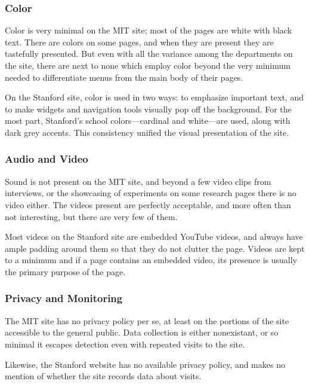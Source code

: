 \begin{FlushLeft}
\subsubsection*{Color}

Color is very minimal on the MIT site; most of the pages are white with black text. There
are colors on some pages, and when they are present they are tastefully presented. But
even with all the variance among the departments on the site, there are next to none
which employ color beyond the very minimum needed to differentiate menus from the main
body of their pages.

On the Stanford site, color is used in two ways: to emphasize important text,
and to make widgets and navigation tools visually pop off the background.
For the most part, Stanford's school colors---cardinal and white---are used,
along with dark grey accents. This consistency unified the visual presentation
of the site.

\subsubsection*{Audio and Video}

Sound is not present on the MIT site, and beyond a few video clips from interviews, or the
showcasing of experiments on some research pages there is no video either. The videos
present are perfectly acceptable, and more often than not interesting, but there are very
few of them.

Most videos on the Stanford site are embedded YouTube videos, and always have ample
padding around them so that they do not clutter the page. Videos are kept to a
minimum and if a page contains an embedded video, its presence is usually the
primary purpose of the page.

\subsubsection*{Privacy and Monitoring}

The MIT site has no privacy policy per se, at least on the portions of the site accessible to the
general public. Data collection is either nonexistant, or so
minimal it escapes detection even with repeated visits to the site.

Likewise, the Stanford website has no available privacy policy, and makes no mention
of whether the site records data about visits.
\end{FlushLeft}
